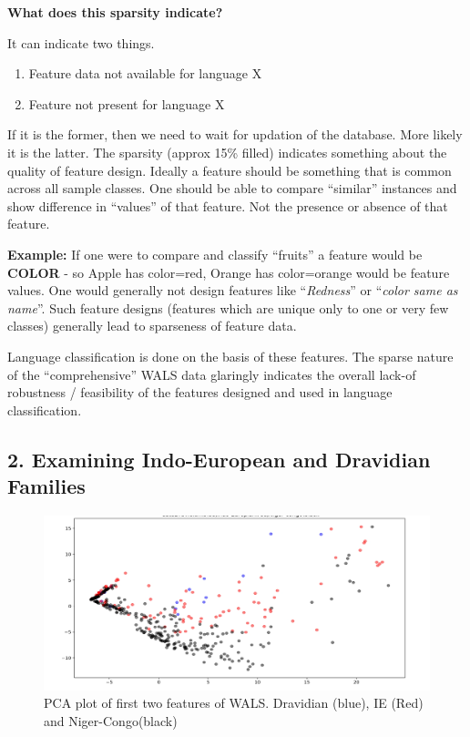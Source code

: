 \textbf{What does this sparsity indicate?}

It can indicate two things.

\begin{enumerate}[{\rm 1)}]
\itemsep=0pt
\item Feature data not available for language X

 \item Feature not present for language X

\end{enumerate}

If it is the former, then we need to wait for updation of the database. More likely it is the latter. The sparsity (approx 15\% filled) indicates something about the quality of feature design. Ideally a feature should be something that is common across all sample classes. One should be able to compare “similar” instances and show difference in “values” of that feature. Not the presence or absence of that feature.

\begin{myquote}
\textbf{Example:} If one were to compare and classify “fruits” a feature would be \textbf{COLOR} - so Apple has {color=red}, Orange has {color=orange} would be feature values. One would generally not design features like “\textit{Redness}” or “\textit{color same as name}”. Such feature designs (features which are unique only to one or very few classes) generally lead to sparseness of feature data.
\end{myquote}

Language classification is done on the basis of these features. The sparse nature of the “comprehensive” WALS data glaringly indicates the overall lack-of robustness / feasibility of the features designed and used in language classification.


\subsection*{2. Examining Indo-European and Dravidian Families}

\begin{figure}[!htbp]
\includegraphics[scale=0.21]{images/6-03.jpg}
\caption{PCA plot of first two features of WALS. Dravidian (blue), IE (Red) and Niger-Congo(black)}\label{art6-fig03}
\end{figure}

